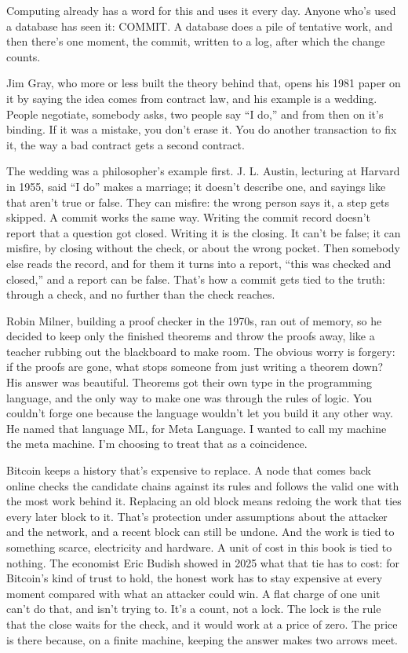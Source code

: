 \documentclass[11pt,twoside]{article}
\theoremstyle{thielethm}
\theoremstyle{thieledef}
\theoremstyle{thieledef}
\theoremstyle{thieledef}
\theoremstyle{thielethm}
\theoremstyle{thieleobs}
\theoremstyle{thielethm}
\begin{document}
Computing already has a word for this and uses it every day. Anyone who's used a database has seen it: COMMIT. A database does a pile of tentative work, and then there's one moment, the commit, written to a log, after which the change counts.

Jim Gray, who more or less built the theory behind that, opens his 1981 paper on it by saying the idea comes from contract law, and his example is a wedding. People negotiate, somebody asks, two people say ``I do,'' and from then on it's binding. If it was a mistake, you don't erase it. You do another transaction to fix it, the way a bad contract gets a second contract.

The wedding was a philosopher's example first. J. L. Austin, lecturing at Harvard in 1955, said ``I do'' makes a marriage; it doesn't describe one, and sayings like that aren't true or false. They can misfire: the wrong person says it, a step gets skipped. A commit works the same way. Writing the commit record doesn't report that a question got closed. Writing it is the closing. It can't be false; it can misfire, by closing without the check, or about the wrong pocket. Then somebody else reads the record, and for them it turns into a report, ``this was checked and closed,'' and a report can be false. That's how a commit gets tied to the truth: through a check, and no further than the check reaches.

Robin Milner, building a proof checker in the 1970s, ran out of memory, so he decided to keep only the finished theorems and throw the proofs away, like a teacher rubbing out the blackboard to make room. The obvious worry is forgery: if the proofs are gone, what stops someone from just writing a theorem down? His answer was beautiful. Theorems got their own type in the programming language, and the only way to make one was through the rules of logic. You couldn't forge one because the language wouldn't let you build it any other way. He named that language ML, for Meta Language. I wanted to call my machine the meta machine. I'm choosing to treat that as a coincidence.

Bitcoin keeps a history that's expensive to replace. A node that comes back online checks the candidate chains against its rules and follows the valid one with the most work behind it. Replacing an old block means redoing the work that ties every later block to it. That's protection under assumptions about the attacker and the network, and a recent block can still be undone. And the work is tied to something scarce, electricity and hardware. A unit of cost in this book is tied to nothing. The economist Eric Budish showed in 2025 what that tie has to cost: for Bitcoin's kind of trust to hold, the honest work has to stay expensive at every moment compared with what an attacker could win. A flat charge of one unit can't do that, and isn't trying to. It's a count, not a lock. The lock is the rule that the close waits for the check, and it would work at a price of zero. The price is there because, on a finite machine, keeping the answer makes two arrows meet.
\end{document}

